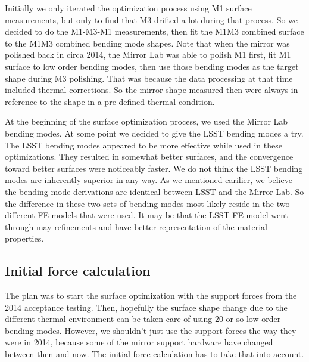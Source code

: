 \documentclass [twoside,openbib,12pt]{article}
\begin{document}
Initially we only
iterated the optimization process using M1 surface measurements, but
only to find that M3 drifted a lot during that process.
So we decided to do the M1-M3-M1 measurements, then fit the M1M3
combined surface to the M1M3 combined bending mode shapes.
Note that when the mirror was polished back in circa 2014, the Mirror
Lab was able to polish M1 first, fit M1 surface to low order bending
modes, then use those bending modes as the target shape during M3
polishing. That was because the data processing at that time included
thermal corrections. So the mirror shape measured then were always in
reference to the shape in a pre-defined thermal condition.

At the beginning of the surface optimization process, we used the
Mirror Lab bending modes. At some point we decided to give the LSST
bending modes a try. The LSST bending modes appeared to be
more effective while used in these optimizations. They resulted in
somewhat better surfaces, and the convergence toward better surfaces
were noticeably faster.
We do not think the LSST bending modes are inherently superior in any
way.
As we mentioned earilier, we believe the bending mode derivations are
identical between LSST and the Mirror Lab. So the difference in these
two sets of bending modes most likely reside in the two different FE
models that were used. It may be that the LSST FE model went through
may refinements and have better representation of the material properties.

\subsection{Initial force calculation}
\label{sec:initF}

The plan was to start the surface optimization with the support forces
from the 2014 acceptance testing. Then, hopefully the surface shape
change due to the different thermal environment can be taken care of
using 20 or so low order bending modes.
However, we shouldn't just use the support forces the way they were in
2014, because some of the mirror support hardware have changed between
then and now. The initial force calculation has to take that into
account.
\end{document}

